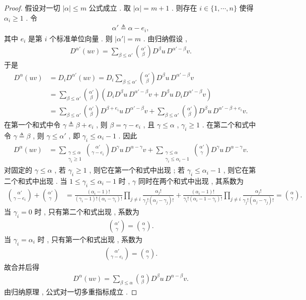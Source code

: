 \documentclass[../../main.tex]{subfiles}
\begin{document}
\begin{proof}
假设对一切 \(|\alpha|\leqslant m\) 公式成立 . 取 \(|\alpha|=m+1\) . 则存在 \(i\in\{1,\cdots,n\}\) 使得 \(\alpha_i\geqslant1\) . 令
\begin{align*}
\alpha'\triangleq\alpha-e_i,
\end{align*}
其中 \(e_i\) 是第 \(i\) 个标准单位向量 . 则 \(|\alpha'|=m\) . 由归纳假设 ,
\begin{align*}
D^{\alpha'}(uv)=\sum\limits_{\beta\leqslant\alpha'}\binom{\alpha'}{\beta}D^\beta u\,D^{\alpha'-\beta}v.
\end{align*}
于是
\begin{align*}
D^\alpha(uv)
&=D_iD^{\alpha'}(uv)=D_i\sum\limits_{\beta\leqslant\alpha'}\binom{\alpha'}{\beta}D^\beta u\,D^{\alpha'-\beta}v\\
&=\sum\limits_{\beta\leqslant\alpha'}\binom{\alpha'}{\beta}\left(D_iD^\beta u\,D^{\alpha'-\beta}v+D^\beta u\,D_iD^{\alpha'-\beta}v\right)\\
&=\sum\limits_{\beta\leqslant\alpha'}\binom{\alpha'}{\beta}D^{\beta+e_i}u\,D^{\alpha'-\beta}v
+\sum\limits_{\beta\leqslant\alpha'}\binom{\alpha'}{\beta}D^\beta u\,D^{\alpha'-\beta+e_i}v.
\end{align*}
在第一个和式中令 \(\gamma\triangleq\beta+e_i\) , 则 \(\beta=\gamma-e_i\) , 且 \(\gamma\leqslant\alpha\) , \(\gamma_i\geqslant1\) . 在第二个和式中令 \(\gamma\triangleq\beta\) , 则 \(\gamma\leqslant\alpha'\) , 即 \(\gamma_i\leqslant\alpha_i-1\) . 因此
\begin{align*}
D^\alpha(uv)
&=\sum\limits_{\substack{\gamma\leqslant\alpha\\ \gamma_i\geqslant1}}\binom{\alpha'}{\gamma-e_i}D^\gamma u\,D^{\alpha-\gamma}v
+\sum\limits_{\substack{\gamma\leqslant\alpha\\ \gamma_i\leqslant\alpha_i-1}}\binom{\alpha'}{\gamma}D^\gamma u\,D^{\alpha-\gamma}v.
\end{align*}
对固定的 \(\gamma\leqslant\alpha\) , 若 \(\gamma_i\geqslant1\) , 则它在第一个和式中出现 ; 若 \(\gamma_i\leqslant\alpha_i-1\) , 则它在第二个和式中出现 . 当 \(1\leqslant\gamma_i\leqslant\alpha_i-1\) 时 , \(\gamma\) 同时在两个和式中出现 , 其系数为
\begin{align*}
\binom{\alpha'}{\gamma-e_i}+\binom{\alpha'}{\gamma}
&=\frac{(\alpha_i-1)!}{(\gamma_i-1)!(\alpha_i-\gamma_i)!}\prod\limits_{j\neq i}\frac{\alpha_j!}{\gamma_j!(\alpha_j-\gamma_j)!}
+\frac{(\alpha_i-1)!}{\gamma_i!(\alpha_i-1-\gamma_i)!}\prod\limits_{j\neq i}\frac{\alpha_j!}{\gamma_j!(\alpha_j-\gamma_j)!}=\binom{\alpha}{\gamma}.
\end{align*}
当 \(\gamma_i=0\) 时 , 只有第二个和式出现 , 系数为
\begin{align*}
\binom{\alpha'}{\gamma}=\binom{\alpha}{\gamma}.
\end{align*}
当 \(\gamma_i=\alpha_i\) 时 , 只有第一个和式出现 , 系数为
\begin{align*}
\binom{\alpha'}{\gamma-e_i}=\binom{\alpha}{\gamma}.
\end{align*}
故合并后得
\begin{align*}
D^\alpha(uv)=\sum\limits_{\beta\leqslant\alpha}\binom{\alpha}{\beta}D^\beta u\,D^{\alpha-\beta}v.
\end{align*}
由归纳原理 , 公式对一切多重指标成立 .
\end{proof}
\end{document}

